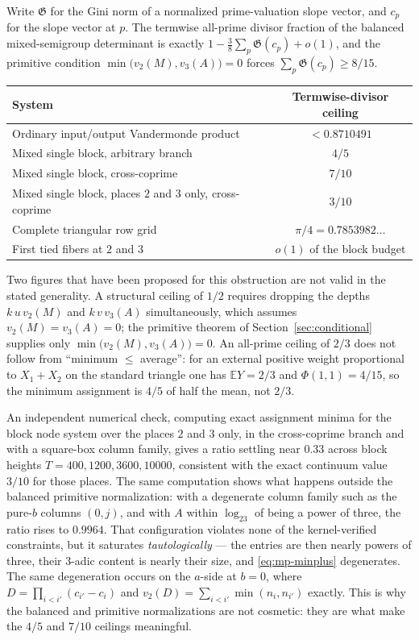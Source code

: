 \documentclass[11pt,oneside]{article}
\theoremstyle{definition}
\theoremstyle{remark}
\newcommand{\vpp}[2]{v_{#1}\!\left(#2\right)}
\begin{document}
Write $\mathfrak G$ for the Gini norm of a normalized prime-valuation slope vector, and $c_p$
for the slope vector at $p$.  The termwise all-prime divisor fraction of the balanced
mixed-semigroup determinant is exactly $1-\tfrac38\sum_p\mathfrak G(c_p)+o(1)$, and the
primitive condition $\min\bigl(\vpp2M,\vpp3A\bigr)=0$ forces $\sum_p\mathfrak G(c_p)\ge8/15$.

\begin{center}
\begin{tabular}{lc}
\toprule
System & Termwise-divisor ceiling \\
\midrule
Ordinary input/output Vandermonde product & $<0.8710491$ \\
Mixed single block, arbitrary branch & $4/5$ \\
Mixed single block, cross-coprime & $7/10$ \\
Mixed single block, places $2$ and $3$ only, cross-coprime & $3/10$ \\
Complete triangular row grid & $\pi/4=0.7853982\ldots$ \\
First tied fibers at $2$ and $3$ & $o(1)$ of the block budget \\
\bottomrule
\end{tabular}
\end{center}

Two figures that have been proposed for this obstruction are not valid in the stated
generality.  A structural ceiling of $1/2$ requires dropping the depths $k\,u\,\vpp2M$ and
$k\,v\,\vpp3A$ simultaneously, which assumes $\vpp2M=\vpp3A=0$; the primitive theorem of
Section~\ref{sec:conditional} supplies only $\min\bigl(\vpp2M,\vpp3A\bigr)=0$.  An all-prime
ceiling of $2/3$ does not follow from ``minimum $\le$ average'': for an external positive weight
proportional to $X_1+X_2$ on the standard triangle one has $\mathbb E Y=2/3$ and
$\Phi(1,1)=4/15$, so the minimum assignment is $4/5$ of half the mean, not $2/3$.

An independent numerical check, computing exact assignment minima for the block node system
over the places $2$ and $3$ only, in the cross-coprime branch and with a square-box column
family, gives a ratio settling near $0.33$ across block heights $T=400,1200,3600,10000$,
consistent with the exact continuum value $3/10$ for those places.  The same computation shows
what happens outside the balanced primitive normalization: with a degenerate column family such
as the pure-$b$ columns $(0,j)$, and with $A$ within $\log_23$ of being a power of three, the
ratio rises to $0.9964$.  That configuration violates none of the kernel-verified constraints,
but it saturates \emph{tautologically} --- the entries are then nearly powers of three, their
$3$-adic content is nearly their size, and \eqref{eq:mp-minplus} degenerates.  The same
degeneration occurs on the $a$-side at $b=0$, where $D=\prod_{i<i'}(c_{i'}-c_i)$ and
$v_2(D)=\sum_{i<i'}\min(n_i,n_{i'})$ exactly.  This is why the balanced and primitive
normalizations are not cosmetic: they are what make the $4/5$ and $7/10$ ceilings meaningful.
\end{document}
